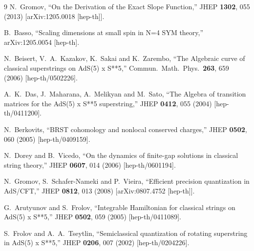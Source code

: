 \documentclass[a4paper,11pt]{article}
\numberwithin{equation}{section}
\begin{document}
\begin{thebibliography} {9}
  N.~Gromov,
  ``On the Derivation of the Exact Slope Function,''
  JHEP {\bf 1302}, 055 (2013)
  [arXiv:1205.0018 [hep-th]].

  B.~Basso,
  ``Scaling dimensions at small spin in N=4 SYM theory,''
  arXiv:1205.0054 [hep-th].

  N.~Beisert, V.~A.~Kazakov, K.~Sakai and K.~Zarembo,
  ``The Algebraic curve of classical superstrings on AdS(5) x S**5,''
  Commun.\ Math.\ Phys.\  {\bf 263}, 659 (2006)
  [hep-th/0502226].

  A.~K.~Das, J.~Maharana, A.~Melikyan and M.~Sato,
  ``The Algebra of transition matrices for the AdS(5) x S**5 superstring,''
  JHEP {\bf 0412}, 055 (2004)
  [hep-th/0411200].

  N.~Berkovits,
  ``BRST cohomology and nonlocal conserved charges,''
  JHEP {\bf 0502}, 060 (2005)
  [hep-th/0409159].

  N.~Dorey and B.~Vicedo,
  ``On the dynamics of finite-gap solutions in classical string theory,''
  JHEP {\bf 0607}, 014 (2006)
  [hep-th/0601194].

  N.~Gromov, S.~Schafer-Nameki and P.~Vieira,
  ``Efficient precision quantization in AdS/CFT,''
  JHEP {\bf 0812}, 013 (2008)
  [arXiv:0807.4752 [hep-th]].

  G.~Arutyunov and S.~Frolov,
  ``Integrable Hamiltonian for classical strings on AdS(5) x S**5,''
  JHEP {\bf 0502}, 059 (2005)
  [hep-th/0411089].

  S.~Frolov and A.~A.~Tseytlin,
  ``Semiclassical quantization of rotating superstring in AdS(5) x S**5,''
  JHEP {\bf 0206}, 007 (2002)
  [hep-th/0204226].


\end{thebibliography}
\end{document}

